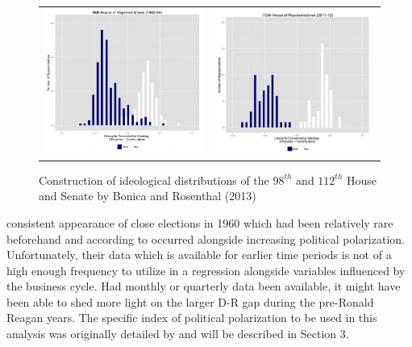 \documentclass[a4paper, 12pt]{article}
\begin{document}
\begin{figure}[!ht]
\begin{tabular}{cc}
    \includegraphics{images/Picture3.png} & \includegraphics{images/Picture4.png} \\
    \end{tabular}
    \caption{ Construction of ideological distributions of the $98^{th}$ and $112^{th}$ House and Senate by Bonica and Rosenthal (2013)}
    \label{fig:my_label}
\end{figure}

\noindent consistent appearance of close elections in 1960 which had been relatively rare beforehand and according to  occurred alongside increasing political polarization. Unfortunately, their data which is available for earlier time periods is not of a high enough frequency to utilize in a regression alongside variables influenced by the business cycle. Had monthly or quarterly data been available, it might have been able to shed more light on the larger D-R gap during the pre-Ronald Reagan years. The specific index of political polarization to be used in this analysis was originally detailed by  and will be described in Section 3. \par 
\end{document}
